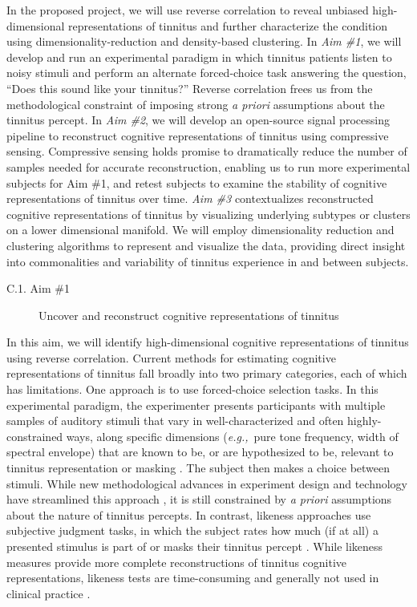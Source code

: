 \documentclass[11pt, notitlepage]{article} %
\def\eg{{\emph{e.g.,}}~}
\begin{document}
In the proposed project, we will use reverse correlation to reveal unbiased high-dimensional
representations of tinnitus and further characterize the condition
using dimensionality-reduction and density-based clustering.
In \emph{Aim \#1}, we will develop and run an experimental paradigm
in which tinnitus patients listen to noisy stimuli and perform an alternate forced-choice task
answering the question, ``Does this sound like your tinnitus?''
Reverse correlation frees us from the methodological constraint of imposing strong \emph{a priori}
assumptions about the tinnitus percept.
In \emph{Aim \#2}, we will develop an open-source signal processing pipeline
to reconstruct cognitive representations of tinnitus using compressive sensing.
Compressive sensing holds promise to dramatically reduce the number of samples
needed for accurate reconstruction, enabling us to run more experimental subjects for Aim \#1,
and retest subjects to examine the stability of cognitive representations of tinnitus over time.
\emph{Aim \#3} contextualizes reconstructed cognitive representations of tinnitus
by visualizing underlying subtypes or clusters on a lower dimensional manifold.
We will employ dimensionality reduction and clustering algorithms to represent and visualize the data,
providing direct insight into commonalities and variability of tinnitus experience in and between subjects.

\begin{description}
	\item[C.1. Aim \#1]{Uncover and reconstruct cognitive representations of tinnitus} 
\end{description}

In this aim, we will identify high-dimensional cognitive representations of tinnitus using reverse correlation.
Current methods for estimating cognitive representations of tinnitus fall broadly into two primary categories,
each of which has limitations.
One approach is to use forced-choice selection tasks.
In this experimental paradigm,
the experimenter presents participants with multiple samples of auditory stimuli that vary in well-characterized
and often highly-constrained ways, along specific dimensions (\eg pure tone frequency, width of spectral envelope)
that are known to be, or are hypothesized to be, relevant to tinnitus representation or masking
\cite{vajsakovicPrinciplesMethodsPsychoacoustic2021}.
The subject then makes a choice between stimuli.
While new methodological advances in experiment design and technology have streamlined this approach
\cite{korthOneStepCloser2020,henryComputerautomatedTinnitusAssessment2004,henryComputerautomatedTinnitusAssessment2013},
it is still constrained by \emph{a priori} assumptions about the nature of tinnitus percepts.
In contrast, likeness approaches use subjective judgment tasks,
in which the subject rates how much (if at all) a presented stimulus is part of or masks their tinnitus percept
\cite{norenaPsychoacousticCharacterizationTinnitus2002}.
While likeness measures provide more complete reconstructions of tinnitus cognitive representations,
likeness tests are time-consuming and generally not used in clinical practice
\cite{vajsakovicPrinciplesMethodsPsychoacoustic2021}.
\end{document}
